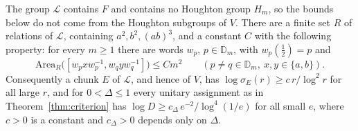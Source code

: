 \begin{proposition}\label{prop:thompson}
The group $\mathcal L$ contains $F$ and contains no Houghton group $H_m$, so the bounds below do not come from the
Houghton subgroups of $V$. There are a finite set $R$ of relations of $\mathcal L$, containing $a^2,b^2,(ab)^3$, and a constant $C$ with the
following property: for every $m\ge1$ there are words $w_p$, $p\in\mathbb D_m$, with $w_p(\frac12)=p$ and
\[
\mathrm{Area}_R\bigl([w_pxw_p^{-1},w_qyw_q^{-1}]\bigr)\le Cm^2\qquad(p\ne q\in\mathbb D_m,\ x,y\in\{a,b\}).
\]
Consequently a chunk $E$ of $\mathcal L$, and hence of $V$, has $\log\sigma_E(r)\ge c\,r/\log^2r$ for all large $r$, and for $0<\Delta\le1$
every unitary assignment as in Theorem~\ref{thm:criterion} has $\log D\ge c_\Delta\,e^{-2}/\log^4(1/e)$ for all small $e$, where $c>0$ is a
constant and $c_\Delta>0$ depends only on $\Delta$.
\end{proposition}

